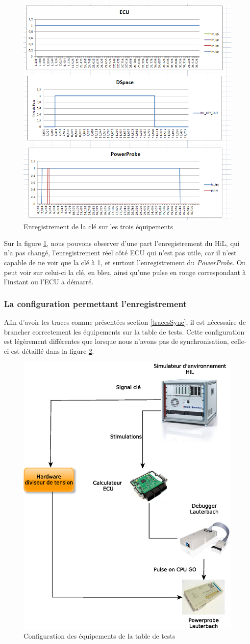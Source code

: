 \begin{figure}[H]
	\centering
	\includegraphics[width=0.61\linewidth]{contents/images/sync3}
	\caption{Enregistrement de la clé sur les trois équipements}
	\label{fig:tracesigk}
\end{figure}

Sur la figure \ref{fig:tracesigk}, nous pouvons observer d'une part l'enregistrement du HiL, qui n'a pas changé, l'enregistrement réel côté ECU qui n'est pas utile, car il n'est capable de ne voir que la clé à 1, et surtout l'enregistrement du \textit{PowerProbe}. On peut voir sur celui-ci la clé, en bleu, ainsi qu'une pulse en rouge correspondant à l'instant ou l'ECU a démarré. 

\subsubsection{La configuration permettant l'enregistrement}
Afin d'avoir les traces comme présentées section  \ref{tracesSync}, il est nécessaire de brancher correctement les équipements sur la table de tests. Cette configuration est légèrement différentes que lorsque nous n'avons pas de synchronisation, celle-ci est détaillé dans la figure \ref{fig:tracesSync}.

\begin{figure}[H]
\centering
\includegraphics[width=0.42\linewidth]{contents/images/tracesSync}
\caption{Configuration des équipements de la table de tests}
\label{fig:tracesSync}
\end{figure}


